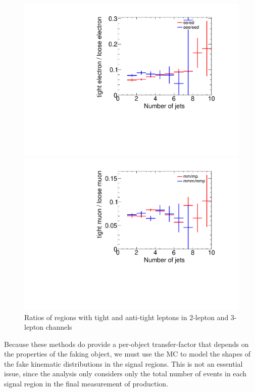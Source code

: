 \begin{figure}[htbp]
\begin{minipage}[h]{0.5\textwidth}
    \centering \includegraphics[width=\textwidth]{figs/fake/compare_2e_3e_NJet_ratios}
\end{minipage}\hfill
\begin{minipage}[h]{0.5\textwidth}
    \centering \includegraphics[width=\textwidth]{figs/fake/compare_2m_3m_NJet_ratios}
\end{minipage}\hfill
\caption{Ratios of regions with tight and anti-tight leptons in 2-lepton and 3-lepton channels}
\label{figure:background_njetr}
\end{figure}

Because these methods do provide a per-object transfer-factor that depends on the properties of the faking object, we must use the MC to model the shapes of the fake kinematic distributions in the signal regions. This is not an essential issue, since the analysis only considers only the total number of events in each signal region in the final measurement of \tth production.

